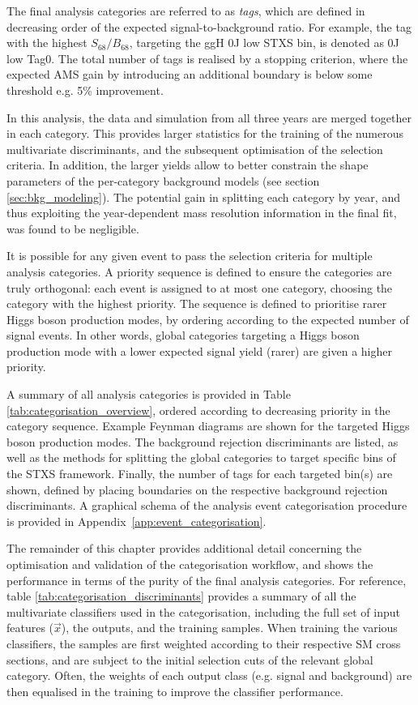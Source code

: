 \begin{enumerate}
    The final analysis categories are referred to as \textit{tags}, which are defined in decreasing order of the expected signal-to-background ratio. For example, the tag with the highest $S_{68}/B_{68}$, targeting the ggH 0J low \ptH STXS bin, is denoted as 0J low \ptgg Tag0. The total number of tags is realised by a stopping criterion, where the expected AMS gain by introducing an additional boundary is below some threshold e.g. 5\% improvement.
\end{enumerate}

In this analysis, the data and simulation from all three years are merged together in each category. This provides larger statistics for the training of the numerous multivariate discriminants, and the subsequent optimisation of the selection criteria. In addition, the larger yields allow to better constrain the shape parameters of the per-category background models (see section \ref{sec:bkg_modeling}). The potential gain in splitting each category by year, and thus exploiting the year-dependent mass resolution information in the final fit, was found to be negligible. 

It is possible for any given event to pass the selection criteria for multiple analysis categories. A priority sequence is defined to ensure the categories are truly orthogonal: each event is assigned to at most one category, choosing the category with the highest priority. The sequence is defined to prioritise rarer Higgs boson production modes, by ordering according to the expected number of signal events. In other words, global categories targeting a Higgs boson production mode with a lower expected signal yield (rarer) are given a higher priority.

A summary of all analysis categories is provided in Table \ref{tab:categorisation_overview}, ordered according to decreasing priority in the category sequence. Example Feynman diagrams are shown for the targeted Higgs boson production modes. The background rejection discriminants are listed, as well as the methods for splitting the global categories to target specific bins of the STXS framework. Finally, the number of tags for each targeted bin(s) are shown, defined by placing boundaries on the respective background rejection discriminants. A graphical schema of the analysis event categorisation procedure is provided in Appendix~\ref{app:event_categorisation}.

The remainder of this chapter provides additional detail concerning the optimisation and validation of the categorisation workflow, and shows the performance in terms of the purity of the final analysis categories. For reference, table \ref{tab:categorisation_discriminants} provides a summary of all the multivariate classifiers used in the categorisation, including the full set of input features ($\vec{x}$), the outputs, and the training samples. When training the various classifiers, the samples are first weighted according to their respective SM cross sections, and are subject to the initial selection cuts of the relevant global category. Often, the weights of each output class (e.g. signal and background) are then equalised in the training to improve the classifier performance.

